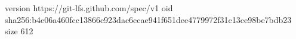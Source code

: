version https://git-lfs.github.com/spec/v1
oid sha256:b4e06a460fcc13866c923dac6ccae941f651dee4779972f31c13ce98be7bdb23
size 612
